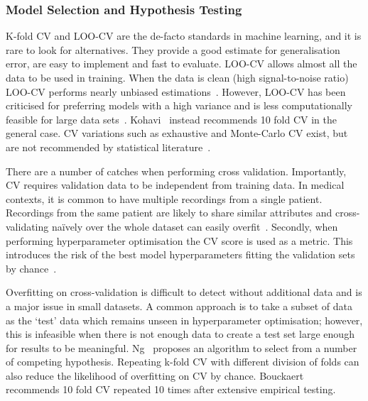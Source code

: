 \documentclass[12pt, twoside]{book}
\begin{document}
\subsubsection{Model Selection and Hypothesis Testing }

K-fold CV and LOO-CV are the de-facto standards in machine learning, and it is rare to look for alternatives. They provide a good estimate for generalisation error, are easy to implement and fast to evaluate. LOO-CV allows almost all the data to be used in training. When the data is clean (high signal-to-noise ratio) LOO-CV performs nearly unbiased estimations~\cite{crossvalsurvey}. However, LOO-CV has been criticised for preferring models with a high variance and is less computationally feasible for large data sets~\cite{kohavi1995study}. Kohavi~\cite{kohavi1995study} instead recommends 10 fold CV in the general case. CV variations such as exhaustive and Monte-Carlo CV exist, but are not recommended by statistical literature~\cite{kfoldvsloo, crossvalsurvey}. 

There are a number of catches when performing cross validation. Importantly, CV requires validation data to be independent from training data. In medical contexts, it is common to have multiple recordings from a single patient. Recordings from the same patient are likely to share similar attributes and cross-validating na\"{i}vely over the whole dataset can easily overfit~\cite{mpowerneto2017analysis}. Secondly, when performing hyperparameter optimisation the CV score is used as a metric. This introduces the risk of the best model hyperparameters fitting the validation sets by chance~\cite{overfittingcv}.

Overfitting on cross-validation is difficult to detect without additional data and is a major issue in small datasets. A common approach is to take a subset of data as the `test' data which remains unseen in hyperparameter optimisation; however, this is infeasible when there is not enough data to create a test set large enough for results to be meaningful. Ng~\cite{overfittingcv} proposes an algorithm to select from a number of competing hypothesis. Repeating k-fold CV with different division of folds can also reduce the likelihood of overfitting on CV by chance. Bouckaert~\cite{bestcvempirical} recommends 10 fold CV repeated 10 times after extensive empirical testing.
\end{document}
